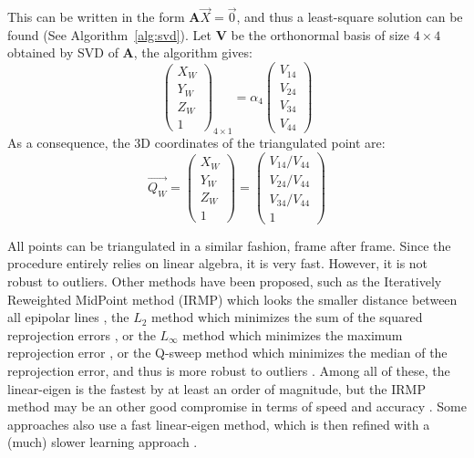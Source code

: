 This can be written in the form \(\textbf{A} \overrightarrow{X} = \overrightarrow{0}\), and thus a least-square solution can be found (See Algorithm~\ref{alg:svd}). Let $\textbf{V}$ be the orthonormal basis of size $4 \times 4$ obtained by SVD of $\textbf{A}$, the algorithm gives:
\begin{equation}
  \begin{pmatrix} X_W \\ Y_W \\ Z_W\\1 \end{pmatrix}_{\!\!4\times 1} 
  = \alpha_4 \begin{pmatrix}V_{14} \\V_{24} \\V_{34} \\V_{44}\end{pmatrix} 
\end{equation} 
As a consequence, the 3D coordinates of the triangulated point are:
\begin{equation}
  \boxed{
  \overrightarrow{Q_W}=\begin{pmatrix}X_W \\Y_W \\Z_W \\1\end{pmatrix} = \begin{pmatrix}V_{14}/V_{44} \\V_{24}/V_{44} \\V_{34}/V_{44} \\1\end{pmatrix}
  }
\end{equation}  

All points can be triangulated in a similar fashion, frame after frame. Since the procedure entirely relies on linear algebra, it is very fast. However, it is not robust to outliers. Other methods have been proposed, such as the Iteratively Reweighted MidPoint method (IRMP) which looks the smaller distance between all epipolar lines \cite{Yang2019}, the $L_2$ method which minimizes the sum of the squared reprojection errors \cite{Marquardt1963,More1978}, or the $L_\infty$ method which minimizes the maximum reprojection error \cite{Donne2015}, or the Q-sweep method which minimizes the median of the reprojection error, and thus is more robust to outliers \cite{Zhang2017}. Among all of these, the linear-eigen is the fastest by at least an order of magnitude, but the IRMP method may be an other good compromise in terms of speed and accuracy \cite{Chen2020b}. Some approaches also use a fast linear-eigen method, which is then refined with a (much) slower learning approach \cite{Tome2018}.

